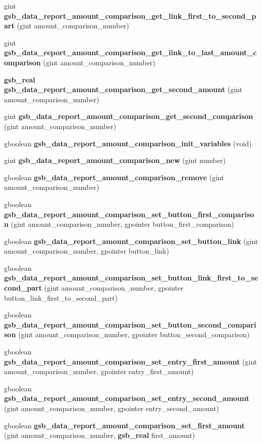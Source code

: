 \begin{DoxyCompactItemize}
\item 
gint {\bf gsb\_\-data\_\-report\_\-amount\_\-comparison\_\-get\_\-link\_\-first\_\-to\_\-second\_\-part} (gint amount\_\-comparison\_\-number)
\item 
gint {\bf gsb\_\-data\_\-report\_\-amount\_\-comparison\_\-get\_\-link\_\-to\_\-last\_\-amount\_\-comparison} (gint amount\_\-comparison\_\-number)
\item 
{\bf gsb\_\-real} {\bf gsb\_\-data\_\-report\_\-amount\_\-comparison\_\-get\_\-second\_\-amount} (gint amount\_\-comparison\_\-number)
\item 
gint {\bf gsb\_\-data\_\-report\_\-amount\_\-comparison\_\-get\_\-second\_\-comparison} (gint amount\_\-comparison\_\-number)
\item 
gboolean {\bf gsb\_\-data\_\-report\_\-amount\_\-comparison\_\-init\_\-variables} (void)
\item 
gint {\bf gsb\_\-data\_\-report\_\-amount\_\-comparison\_\-new} (gint number)
\item 
gboolean {\bf gsb\_\-data\_\-report\_\-amount\_\-comparison\_\-remove} (gint amount\_\-comparison\_\-number)
\item 
gboolean {\bf gsb\_\-data\_\-report\_\-amount\_\-comparison\_\-set\_\-button\_\-first\_\-comparison} (gint amount\_\-comparison\_\-number, gpointer button\_\-first\_\-comparison)
\item 
gboolean {\bf gsb\_\-data\_\-report\_\-amount\_\-comparison\_\-set\_\-button\_\-link} (gint amount\_\-comparison\_\-number, gpointer button\_\-link)
\item 
gboolean {\bf gsb\_\-data\_\-report\_\-amount\_\-comparison\_\-set\_\-button\_\-link\_\-first\_\-to\_\-second\_\-part} (gint amount\_\-comparison\_\-number, gpointer button\_\-link\_\-first\_\-to\_\-second\_\-part)
\item 
gboolean {\bf gsb\_\-data\_\-report\_\-amount\_\-comparison\_\-set\_\-button\_\-second\_\-comparison} (gint amount\_\-comparison\_\-number, gpointer button\_\-second\_\-comparison)
\item 
gboolean {\bf gsb\_\-data\_\-report\_\-amount\_\-comparison\_\-set\_\-entry\_\-first\_\-amount} (gint amount\_\-comparison\_\-number, gpointer entry\_\-first\_\-amount)
\item 
gboolean {\bf gsb\_\-data\_\-report\_\-amount\_\-comparison\_\-set\_\-entry\_\-second\_\-amount} (gint amount\_\-comparison\_\-number, gpointer entry\_\-second\_\-amount)
\item 
gboolean {\bf gsb\_\-data\_\-report\_\-amount\_\-comparison\_\-set\_\-first\_\-amount} (gint amount\_\-comparison\_\-number, {\bf gsb\_\-real} first\_\-amount)

\end{DoxyCompactItemize}
